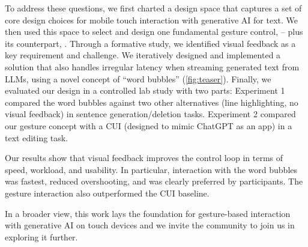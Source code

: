 To address these questions, we first charted a design space that captures a set of core design choices for mobile touch interaction with generative AI for text. 
We then used this space to select and design one fundamental gesture control, \textit{\spread{}} -- plus its counterpart, \textit{\pinch{}}. 
Through a formative study, we identified visual feedback as a key requirement and challenge. We iteratively designed and implemented a solution that also handles irregular latency when streaming generated text from LLMs, using a novel concept of ``word bubbles'' (\cref{fig:teaser}).
Finally, we evaluated our design in a controlled lab study with two parts: Experiment 1 compared the word bubbles against two other alternatives (line highlighting, no visual feedback) in sentence generation/deletion tasks. Experiment 2 compared our gesture concept with a CUI (designed to mimic ChatGPT as an app) in a text editing task.

Our results show that visual feedback improves the control loop in terms of speed, workload, and usability. In particular, interaction with the word bubbles was fastest, reduced overshooting, and was clearly preferred by participants. The gesture interaction also outperformed the CUI baseline.%






In a broader view, this work lays the foundation for gesture-based interaction with generative AI on touch devices and we invite the community to join us in exploring it further.

